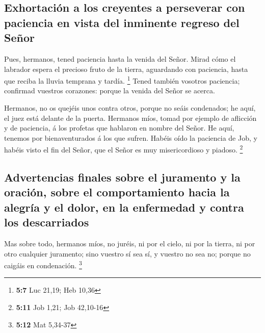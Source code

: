 \hypertarget{exhortaciuxf3n-a-los-creyentes-a-perseverar-con-paciencia-en-vista-del-inminente-regreso-del-seuxf1or}{%
\subsection{Exhortación a los creyentes a perseverar con paciencia en
vista del inminente regreso del
Señor}\label{exhortaciuxf3n-a-los-creyentes-a-perseverar-con-paciencia-en-vista-del-inminente-regreso-del-seuxf1or}}

 Pues, hermanos, tened paciencia hasta la venida del Señor.
Mirad cómo el labrador espera el precioso fruto de la tierra, aguardando
con paciencia, hasta que reciba la lluvia temprana y tardía. \footnote{\textbf{5:7}
  Luc 21,19; Heb 10,36}  Tened también vosotros paciencia;
confirmad vuestros corazones: porque la venida del Señor se acerca.

 Hermanos, no os quejéis unos contra otros, porque no seáis
condenados; he aquí, el juez está delante de la puerta. 
Hermanos míos, tomad por ejemplo de aflicción y de paciencia, á los
profetas que hablaron en nombre del Señor.  He aquí,
tenemos por bienaventurados á los que sufren. Habéis oído la paciencia
de Job, y habéis visto el fin del Señor, que el Señor es muy
misericordioso y piadoso. \footnote{\textbf{5:11} Job 1,21; Job 42,10-16}

\hypertarget{advertencias-finales-sobre-el-juramento-y-la-oraciuxf3n-sobre-el-comportamiento-hacia-la-alegruxeda-y-el-dolor-en-la-enfermedad-y-contra-los-descarriados}{%
\subsection{Advertencias finales sobre el juramento y la oración, sobre
el comportamiento hacia la alegría y el dolor, en la enfermedad y contra
los
descarriados}\label{advertencias-finales-sobre-el-juramento-y-la-oraciuxf3n-sobre-el-comportamiento-hacia-la-alegruxeda-y-el-dolor-en-la-enfermedad-y-contra-los-descarriados}}

 Mas sobre todo, hermanos míos, no juréis, ni por el cielo,
ni por la tierra, ni por otro cualquier juramento; sino vuestro sí sea
sí, y vuestro no sea no; porque no caigáis en condenación. \footnote{\textbf{5:12}
  Mat 5,34-37}

